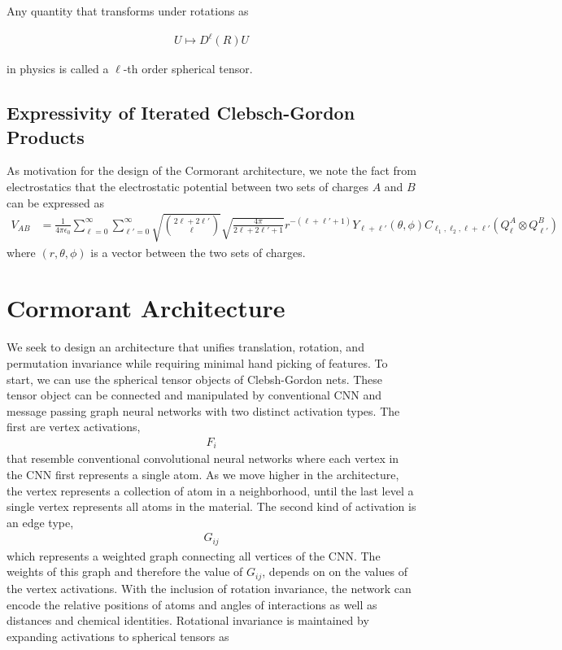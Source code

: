 \documentclass[book.tex]{subfiles}
\begin{document}
Any quantity that transforms under rotations as

\begin{align}
    U \mapsto D^{\ell}(R) U 
\end{align}

in physics is called a $\ell$-th order spherical tensor. 

\subsection{Expressivity of Iterated Clebsch-Gordon Products}

As motivation for the design of the Cormorant architecture, we note the fact from electrostatics that the electrostatic potential between two sets of charges $A$ and $B$ can be expressed as
\begin{align}
V_{AB} &= \frac{1}{4 \pi \epsilon_0} \sum_{\ell = 0}^\infty \sum_{\ell' = 0}^\infty \sqrt{\binom{2 \ell + 2 \ell'}{\ell}} \sqrt{\frac{4 \pi}{2 \ell + 2 \ell' + 1}} r^{-(\ell + \ell' + 1)} Y_{\ell + \ell'}(\theta, \phi) C_{\ell_1, \ell_2, \ell + \ell'} (Q^A_\ell \otimes Q^B_{\ell'})
\end{align}
where $(r, \theta, \phi)$ is a vector between the two sets of charges. 


\section{Cormorant Architecture}

We seek to design an architecture that unifies translation, rotation, and permutation invariance while requiring minimal hand picking of features. To start, we can use the spherical tensor objects of Clebsh-Gordon nets. These tensor object can be connected and manipulated by conventional CNN and message passing graph neural networks with two distinct activation types. The first are vertex activations, 
\begin{align}
F_{i}
\end{align} 
that resemble conventional convolutional neural networks where each vertex in the CNN first represents a single atom. As we move higher in the architecture, the vertex represents a collection of atom in a neighborhood, until the last level a single vertex represents all atoms in the material. The second kind of activation is an edge type, 
\begin{align}
G_{ij}
\end{align}
which represents a weighted graph connecting all vertices of the CNN. The weights of this graph and therefore the value of $G_{ij}$, depends on on the values of the vertex activations. With the inclusion of rotation invariance, the network can encode the relative positions of atoms and angles of interactions as well as distances and chemical identities. Rotational invariance is maintained by expanding  activations to spherical tensors as 
\end{document}

